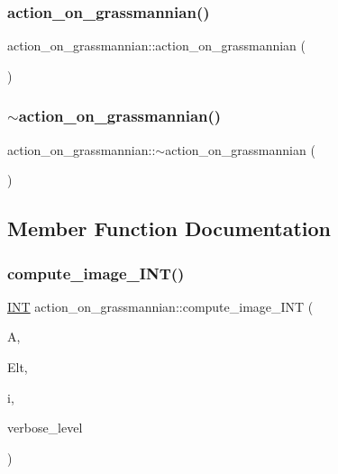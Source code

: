 \subsubsection{\texorpdfstring{action\+\_\+on\+\_\+grassmannian()}{action\_on\_grassmannian()}}
{\footnotesize\ttfamily action\+\_\+on\+\_\+grassmannian\+::action\+\_\+on\+\_\+grassmannian (\begin{DoxyParamCaption}{ }\end{DoxyParamCaption})}

\mbox{\label{classaction__on__grassmannian_a22c5f9f4092ca5d7242c4fe8e6f9bf72}} 
\subsubsection{\texorpdfstring{$\sim$action\+\_\+on\+\_\+grassmannian()}{~action\_on\_grassmannian()}}
{\footnotesize\ttfamily action\+\_\+on\+\_\+grassmannian\+::$\sim$action\+\_\+on\+\_\+grassmannian (\begin{DoxyParamCaption}{ }\end{DoxyParamCaption})}



\subsection{Member Function Documentation}
\mbox{\label{classaction__on__grassmannian_a5379b51e0c1a96eaa1e087a8228604ca}} 
\subsubsection{\texorpdfstring{compute\+\_\+image\+\_\+\+I\+N\+T()}{compute\_image\_INT()}}
{\footnotesize\ttfamily \mbox{\hyperlink{galois_8h_a09fddde158a3a20bd2dcadb609de11dc}{I\+NT}} action\+\_\+on\+\_\+grassmannian\+::compute\+\_\+image\+\_\+\+I\+NT (\begin{DoxyParamCaption}\item[{\mbox{\hyperlink{classaction}{action}} $\ast$}]{A,  }\item[{\mbox{\hyperlink{galois_8h_a09fddde158a3a20bd2dcadb609de11dc}{I\+NT}} $\ast$}]{Elt,  }\item[{\mbox{\hyperlink{galois_8h_a09fddde158a3a20bd2dcadb609de11dc}{I\+NT}}}]{i,  }\item[{\mbox{\hyperlink{galois_8h_a09fddde158a3a20bd2dcadb609de11dc}{I\+NT}}}]{verbose\+\_\+level }\end{DoxyParamCaption})}

